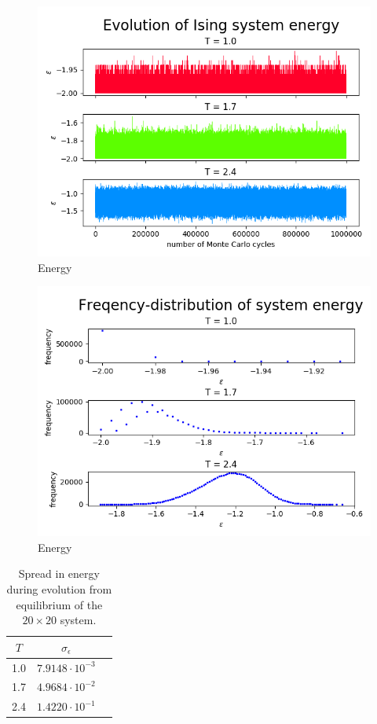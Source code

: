 \documentclass[nofootinbib,reprint,english]{revtex4-1}
\begin{document}
\begin{figure}
\centering
\includegraphics[scale=0.5]{../output/figures/experiment3/system_energy.png}
\caption{Energy}\label{fig:experiment3_system_energy}
\end{figure}

\begin{figure}
\centering
\includegraphics[scale=0.5]{../output/figures/experiment3/energy_distribution.png}
\caption{Energy}\label{fig:experiment3_energy_distribution}
\end{figure}

\begin{table}
\centering
\begin{tabular}{|c|c|c|}
\hline\rule{0pt}{0.32cm}
\(T\) & \(\sigma_\epsilon\)    \\\hline\rule{0pt}{0.32cm}
1.0   & \(7.9148\cdot10^{-3}\) \\\hline\rule{0pt}{0.32cm}
1.7   & \(4.9684\cdot10^{-2}\) \\\hline\rule{0pt}{0.32cm}
2.4   & \(1.4220\cdot10^{-1}\) \\\hline
\end{tabular}
\caption{Spread in energy during evolution from equilibrium of the \(20\times20\) system.}\label{tab:20by20_std_energy_evolution}
\end{table}
\end{document}
